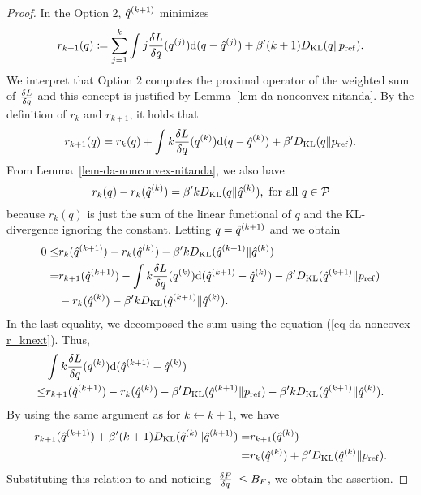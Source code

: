 \begin{proof}
    In the Option 2, $\hat{q}^{(k+1)}$ minimizes
    \begin{equation}
        r_{k+1}(q) \coloneq \sum_{j=1}^k \int  j \frac{\delta L}{\delta q}(q^{(j)})\mathrm{d}(q-\hat{q}^{(j)})
        + \beta' (k+1) D_{\mathrm{KL}}(q\|p_{\rm{ref}}).
    \end{equation}
    We interpret that Option 2 computes the proximal operator of the weighted sum of $\frac{\delta L}{\delta q}$ and this concept is justified by Lemma~\ref{lem-da-nonconvex-nitanda}.
    By the definition of $r_k$ and $r_{k+1}$, it holds that 
    \begin{equation}
        r_{k+1}(q) = r_k(q) + \int k \frac{\delta L}{\delta q}(q^{(k)}) \mathrm{d}(q-\hat{q}^{(k)})
        +\beta' D_{\mathrm{KL}}(q\|p_{\rm{ref}}).\label{eq-da-noncovex-r_knext}
    \end{equation}
    From Lemma~\ref{lem-da-nonconvex-nitanda}, we also have 
    \begin{equation}\label{eq:rkupdateDiff}
        r_k(q) - r_k(\hat{q}^{(k)}) = \beta' k D_{\mathrm{KL}}(q\|\hat{q}^{(k)}), \text{  for all $q \in {\mathcal{P}}$}
    \end{equation}
    because $r_k(q)$ is just the sum of the linear functional of $q$ and the KL-divergence ignoring the constant. 
    Letting $q = \hat{q}^{(k+1)}$ and we obtain
    \begin{align}\label{eq:rkinductionFirstSide}
        0 \leq& r_k(\hat{q}^{(k+1)}) - r_k(\hat{q}^{(k)}) - \beta' k D_{\mathrm{KL}}(\hat{q}^{(k+1)}\|\hat{q}^{(k)})\\
        =& r_{k+1}(\hat{q}^{(k+1)}) -  \int k \frac{\delta L}{\delta q}(q^{(k)}) \mathrm{d}(\hat{q}^{(k+1)}-\hat{q}^{(k)})
        -\beta' D_{\mathrm{KL}}(\hat{q}^{(k+1)}\|p_{\rm{ref}})\\
        &-r_k(\hat{q}^{(k)}) - \beta' k D_{\mathrm{KL}}(\hat{q}^{(k+1)}\|\hat{q}^{(k)}).
    \end{align}
    In the last equality, we decomposed the sum using the equation (\ref{eq-da-noncovex-r_knext}).
    Thus,
    \begin{align}
        &\int k \frac{\delta L}{\delta q}(q^{(k)}) \mathrm{d}(\hat{q}^{(k+1)}-\hat{q}^{(k)})\\
        \leq& r_{k+1}(\hat{q}^{(k+1)}) -r_k(\hat{q}^{(k)}) 
        -\beta' D_{\mathrm{KL}}(\hat{q}^{(k+1)}\|p_{\rm{ref}})
        - \beta' k D_{\mathrm{KL}}(\hat{q}^{(k+1)}\|\hat{q}^{(k)}).
    \end{align}
    By using the same argument as  for $k \leftarrow k+1$, we have 
    \begin{align}
        r_{k+1}(\hat{q}^{(k+1)})
        + \beta' (k+1)D_{\mathrm{KL}}(\hat{q}^{(k)}\|\hat{q}^{(k+1)}) 
        =& r_{k+1}(\hat{q}^{(k)})\\
        =&r_k(\hat{q}^{(k)}) + \beta' D_{\mathrm{KL}}(\hat{q}^{(k)}\|p_{\rm{ref}}).
    \end{align}
    Substituting this relation to  and noticing $|\frac{\delta F}{\delta q}|\leq B_F$, we obtain the assertion. 
\end{proof}


